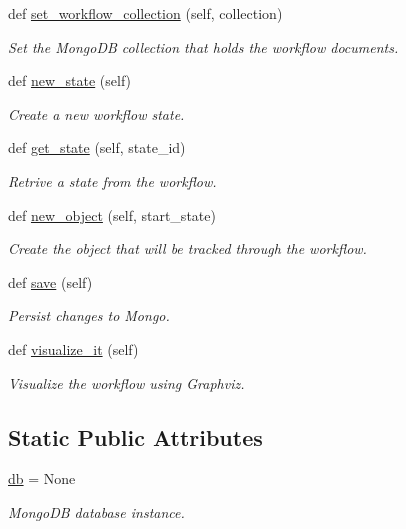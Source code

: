 \begin{DoxyCompactItemize}
def \hyperlink{classmain_1_1_cocopan_a636f9c9ee0425bdc1c4809d52c92fce5}{set\+\_\+workflow\+\_\+collection} (self, collection)
\begin{DoxyCompactList}\small\item\em Set the Mongo\+DB collection that holds the workflow documents. \end{DoxyCompactList}\item 
def \hyperlink{classmain_1_1_cocopan_a1caaa06dd31559d6b24ef8503e3f7013}{new\+\_\+state} (self)
\begin{DoxyCompactList}\small\item\em Create a new workflow state. \end{DoxyCompactList}\item 
def \hyperlink{classmain_1_1_cocopan_a80ff2078aa4d0329f23afd68f095ecf0}{get\+\_\+state} (self, state\+\_\+id)
\begin{DoxyCompactList}\small\item\em Retrive a state from the workflow. \end{DoxyCompactList}\item 
def \hyperlink{classmain_1_1_cocopan_abcf9b046d219915b9e12109cb4030bf1}{new\+\_\+object} (self, start\+\_\+state)
\begin{DoxyCompactList}\small\item\em Create the object that will be tracked through the workflow. \end{DoxyCompactList}\item 
def \hyperlink{classmain_1_1_cocopan_aaada41d82a8822c4ced8b0bbb2fd8908}{save} (self)
\begin{DoxyCompactList}\small\item\em Persist changes to Mongo. \end{DoxyCompactList}\item 
def \hyperlink{classmain_1_1_cocopan_a9f32332006de37c15ecefb69635db519}{visualize\+\_\+it} (self)
\begin{DoxyCompactList}\small\item\em Visualize the workflow using Graphviz. \end{DoxyCompactList}\end{DoxyCompactItemize}
\subsection*{Static Public Attributes}
\begin{DoxyCompactItemize}
\item 
\hyperlink{classmain_1_1_cocopan_ae3c98cef0ee592633894874ad6d1a7ac}{db} = None\hypertarget{classmain_1_1_cocopan_ae3c98cef0ee592633894874ad6d1a7ac}{}\label{classmain_1_1_cocopan_ae3c98cef0ee592633894874ad6d1a7ac}

\begin{DoxyCompactList}\small\item\em Mongo\+DB database instance. \end{DoxyCompactList}\end{DoxyCompactItemize}


